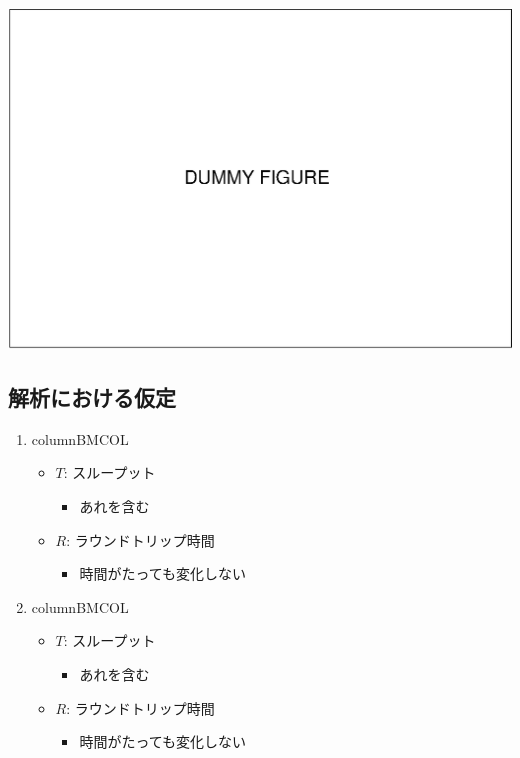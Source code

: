 \documentclass[compress,dvipdfmx,11pt]{beamer}
\begin{document}
\begin{center}
\begin{center}
\includegraphics[width=\columnwidth]{./figure/dummy.eps}
\end{center}
\end{center}

\subsection{解析における仮定}
\label{sec:orgab1e645}

\begin{enumerate}
\item column\hfill{}\textsc{BMCOL}
\label{sec:org2ca8c45}
\begin{itemize}
\item \(T\): スループット
\begin{itemize}
\item あれを含む
\end{itemize}
\item \(R\): ラウンドトリップ時間
\begin{itemize}
\item 時間がたっても変化しない
\end{itemize}
\end{itemize}

\item column\hfill{}\textsc{BMCOL}
\label{sec:org36643b7}
\begin{itemize}
\item \(T\): スループット
\begin{itemize}
\item あれを含む
\end{itemize}
\item \(R\): ラウンドトリップ時間
\begin{itemize}
\item 時間がたっても変化しない
\end{itemize}
\end{itemize}
\end{enumerate}
\end{document}

